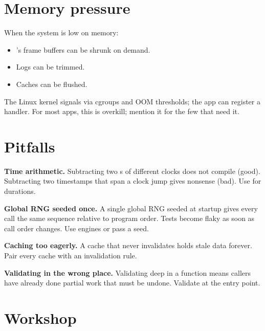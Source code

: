 \section{Memory pressure}

When the system is low on memory:

\begin{itemize}[leftmargin=*]
  \item \maya{}'s frame buffers can be shrunk on demand.
  \item Logs can be trimmed.
  \item Caches can be flushed.
\end{itemize}

The Linux kernel signals via cgroups and OOM thresholds; the
app can register a handler. For most apps, this is overkill;
mention it for the few that need it.

\section{Pitfalls}

\begin{warning}
\textbf{Time arithmetic.} Subtracting two
s of different clocks does not
compile (good). Subtracting two 
timestamps that span a clock jump gives nonsense (bad). Use
 for durations.
\end{warning}

\begin{warning}
\textbf{Global RNG seeded once.} A single global RNG seeded
at startup gives every call the same sequence relative to
program order. Tests become flaky as soon as call order
changes. Use  engines or pass a seed.
\end{warning}

\begin{warning}
\textbf{Caching too eagerly.} A cache that never invalidates
holds stale data forever. Pair every cache with an
invalidation rule.
\end{warning}

\begin{warning}
\textbf{Validating in the wrong place.} Validating deep in a
function means callers have already done partial work that
must be undone. Validate at the entry point.
\end{warning}

\section*{Workshop}

